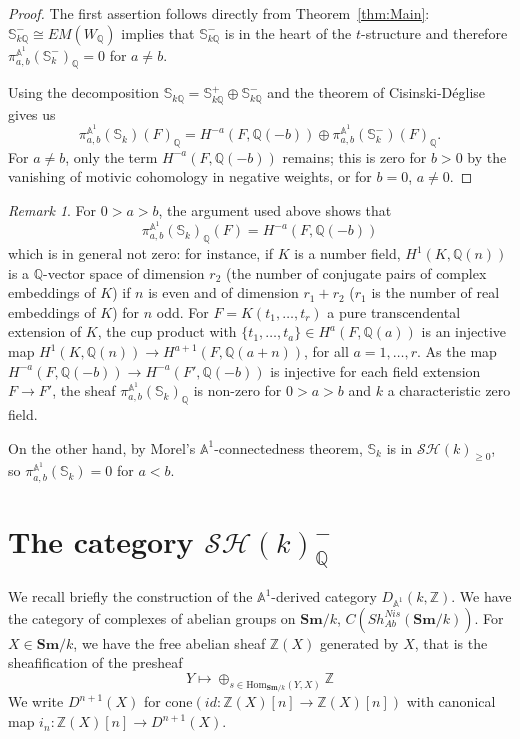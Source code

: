 \documentclass[a4paper,12pt,draft]{amsart}
\theoremstyle{definition}
\theoremstyle{remark}
\newtheorem{remark}{Remark}
\begin{document}
\begin{proof}  The first assertion follows directly from Theorem~\ref{thm:Main}: $\mathbb{S}^-_{k{{\mathbb Q}}}\cong EM(W_{{\mathbb Q}})$ implies that $\mathbb{S}^-_{k{{\mathbb Q}}}$ is in the heart of the $t$-structure and therefore $\pi^{{{\mathbb A}}^1}_{a,b}(\mathbb{S}^-_k)_{{\mathbb Q}}=0$ for $a\neq b$. 

Using the decomposition $\mathbb{S}_{k{{\mathbb Q}}}=\mathbb{S}_{k{{\mathbb Q}}}^+\oplus \mathbb{S}_{k{{\mathbb Q}}}^-$ and the theorem of Cisinski-D\'eglise gives us 
\[
\pi^{{{\mathbb A}}^1}_{a,b}(\mathbb{S}_k)(F)_{{\mathbb Q}}=H^{-a}(F,{{\mathbb Q}}(-b))\oplus \pi^{{{\mathbb A}}^1}_{a,b}(\mathbb{S}^-_k)(F)_{{\mathbb Q}}.
\]
For $a\neq b$, only the term $H^{-a}(F,{{\mathbb Q}}(-b))$ remains; this is zero for $b>0$ by the vanishing of motivic cohomology in negative weights, or for $b=0$, $a\neq0$. 
\end{proof}

\begin{remark} For $0>a>b$, the argument used above shows that 
\[
\pi^{{{\mathbb A}}^1}_{a,b}(\mathbb{S}_k)_{{\mathbb Q}}(F)=H^{-a}(F,{{\mathbb Q}}(-b))
\]
which is in general not zero: for instance, if $K$ is a number field, $H^1(K,{{\mathbb Q}}(n))$ is a ${{\mathbb Q}}$-vector space of dimension $r_2$ (the number of conjugate pairs of complex embeddings of $K$) if $n$ is even and of dimension $r_1+r_2$ ($r_1$ is the number of real embeddings of $K$) for $n$ odd. For $F=K(t_1,\ldots, t_r)$ a pure transcendental extension of $K$, the cup product with $\{t_1,\ldots, t_a\}\in H^a(F,{{\mathbb Q}}(a))$ is an injective map $H^1(K,{{\mathbb Q}}(n))\to H^{a+1}(F, {{\mathbb Q}}(a+n))$, for all $a=1,\ldots, r$. As the map $H^{-a}(F,{{\mathbb Q}}(-b))\to H^{-a}(F',{{\mathbb Q}}(-b))$ is injective for each field extension $F\to F'$,  the sheaf $\pi^{{{\mathbb A}}^1}_{a,b}(\mathbb{S}_k)_{{\mathbb Q}}$ is non-zero for $0>a>b$ and $k$ a characteristic zero field.  

On the other hand, by Morel's ${{\mathbb A}}^1$-connectedness theorem, $\mathbb{S}_k$ is in ${\mathcal{SH}}(k)_{\ge0}$, so $\pi^{{{\mathbb A}}^1}_{a,b}(\mathbb{S}_k)=0$ for $a<b$. 
\end{remark}

\section{The category ${\mathcal{SH}}(k)^-_{{\mathbb Q}}$}\label{sec:WittMot}

We recall briefly the construction of  the ${{\mathbb A}}^1$-derived category $D_{{{\mathbb A}}^1}(k,{{\mathbb Z}})$.  We have the category of complexes of  abelian groups on ${{\mathbf{Sm}}}/k$, $C(Sh^{Nis}_{Ab}({{\mathbf{Sm}}}/k))$. For $X\in {{\mathbf{Sm}}}/k$, we have the free abelian sheaf ${{\mathbb Z}}(X)$ generated by $X$, that is the sheafification of the presheaf
\[
Y\mapsto \oplus_{s\in {\text{Hom}}_{{{\mathbf{Sm}}}/k}(Y,X)}{{\mathbb Z}}
\]
We write $D^{n+1}(X)$ for  $\text{cone}(id:{{\mathbb Z}}(X)[n]\to {{\mathbb Z}}(X)[n])$ with canonical map $i_n:{{\mathbb Z}}(X)[n]\to D^{n+1}(X)$. 
\end{document}
